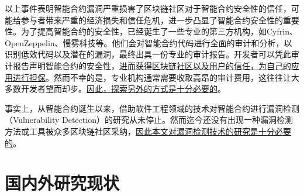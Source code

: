 以上事件表明智能合约漏洞严重损害了区块链社区对于智能合约安全性的信任，可能给参与者带来严重的经济损失和信任危机，进一步凸显了智能合约安全性的重要性。为了提高智能合约的安全性，已经诞生了一些专业的第三方机构，如Cyfrin、OpenZeppelin、慢雾科技等。他们会对智能合约代码进行全面的审计和分析，以识别低效代码以及潜在的漏洞，最终出具一份专业的审计报告。开发者可以凭此审计报告声明智能合约的安全性，\underline{进而获得区块链社区以及用户的信任，为自己的应用进行担保}。然而不幸的是，专业机构通常需要收取高昂的审计费用，这往往让大多数开发者望而却步。\underline{因此，探索另外的方式是十分必要的}。


事实上，从智能合约诞生以来，借助软件工程领域的技术对智能合约进行漏洞检测（Vulnerability Detection）的研究从未停止。然而迄今还没有出现一种漏洞检测方法或工具被众多区块链社区采纳，\underline{因此本文对漏洞检测技术的研究是十分必要的}。


\section{国内外研究现状}
